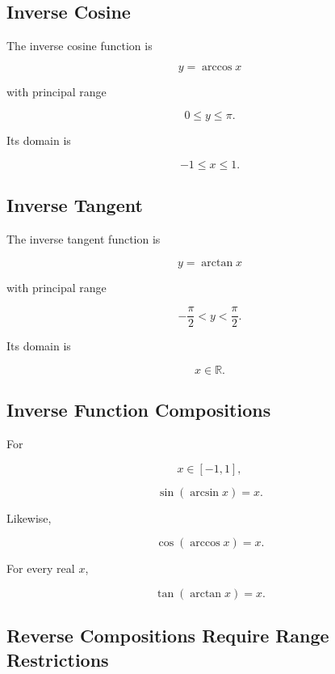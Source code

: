 \subsection{Inverse Cosine}
\label{subsec:inverse-cosine-reference}

The inverse cosine function is

\[
\boxed{
y=\arccos x
}
\]

with principal range

\[
\boxed{
0\leq y\leq\pi.
}
\]

Its domain is

\[
\boxed{
-1\leq x\leq1.
}
\]

\subsection{Inverse Tangent}
\label{subsec:inverse-tangent-reference}

The inverse tangent function is

\[
\boxed{
y=\arctan x
}
\]

with principal range

\[
\boxed{
-\frac{\pi}{2}
<
y
<
\frac{\pi}{2}.
}
\]

Its domain is

\[
\boxed{
x\in\mathbb{R}.
}
\]

\subsection{Inverse Function Compositions}
\label{subsec:inverse-trig-compositions}

For

\[
x\in[-1,1],
\]

\[
\boxed{
\sin(\arcsin x)
=
x.
}
\]

Likewise,

\[
\boxed{
\cos(\arccos x)
=
x.
}
\]

For every real \(x\),

\[
\boxed{
\tan(\arctan x)
=
x.
}
\]

\subsection{Reverse Compositions Require Range Restrictions}
\label{subsec:reverse-inverse-trig-compositions}

